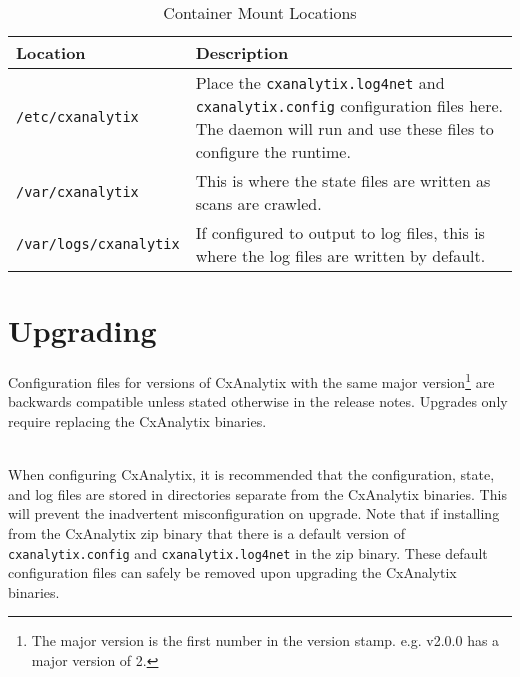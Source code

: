 \begin{table}
    \centering
    \begin{tabular}{|l|l|}
        \toprule
        \textbf{Location} & \textbf{Description}\\
        \midrule
        \verb|/etc/cxanalytix| & \makecell[l]{Place the \texttt{cxanalytix.log4net} and \texttt{cxanalytix.config} configuration files here.
        \\The daemon will run and use these files to configure the runtime.}\\
        \midrule
        \verb|/var/cxanalytix| & This is where the state files are written as scans are crawled.\\
        \midrule
        \verb|/var/logs/cxanalytix| & If configured to output to log files, this is where the log files are written by default.\\
        \bottomrule
    \end{tabular}
    \caption{Container Mount Locations}
    \label{tab:mounts}
\end{table}


\section{Upgrading}

Configuration files for versions of CxAnalytix with the same major version\footnote{The major version is the first 
number in the version stamp.  e.g. v2.0.0 has a major version of 2.} are backwards compatible unless stated otherwise 
in the release notes.  Upgrades only require replacing the CxAnalytix binaries.

\noindent\\When configuring CxAnalytix, it is recommended that the configuration, state, and log files are stored
in directories separate from the CxAnalytix binaries.  This will prevent the inadvertent misconfiguration on upgrade.
Note that if installing from the CxAnalytix zip binary that there is a default version of \texttt{cxanalytix.config}
and \texttt{cxanalytix.log4net} in the zip binary.  These default configuration files can safely be removed upon
upgrading the CxAnalytix binaries.
